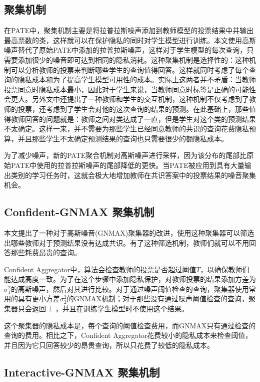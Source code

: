 \documentclass[a4paper]{article}
\begin{document}
\subsection{聚集机制}

在PATE中，聚集机制主要是将拉普拉斯噪声添加到教师模型的投票结果中并输出最高票数的类，这样就可以在保护隐私的同时对学生模型进行训练。本文使用高斯噪声替代了原始PATE中添加的拉普拉斯噪声，这样对于学生模型的每次查询，只需要添加很少的噪音即可达到相同的隐私消耗。这种聚集机制是选择性的：这种机制可以分析教师的投票来判断哪些学生的查询值得回答。这样就同时考虑了每个查询的隐私成本和为了提高学生模型可用性的成本。实际上这两者并不矛盾：当教师投票同意时隐私成本最小，因此对于学生来说，当教师同意时标签是正确的可能性会更大。另外文中还提出了一种教师和学生的交互机制，这种机制不仅考虑到了教师的投票，还考虑到了学生会对他的这次查询的结果的预测。在此基础上，那些值得教师回答的问题就是：教师之间对类达成了一直，但是学生对这个类的预测结果不太确定。这样一来，并不需要为那些学生已经同意教师的共识的查询花费隐私预算，并且那些学生不太确定预测结果的查询也只需要很少的额隐私成本。

为了减少噪声，新的PATE聚合机制对高斯噪声进行采样，因为该分布的尾部比原始PATE中使用的拉普拉斯噪声的尾部降低的更快。当PATE被应用到具有大量输出类别的学习任务时，这就会极大地增加教师在共识答案中的投票结果的噪音聚集机会。

\subsection{Confident-GNMAX 聚集机制}
本文提出了一种对于高斯噪音(GNMAX)聚集器的改进，使用这种聚集器可以筛选出哪些教师对于预测结果没有达成共识。有了这种筛选机制，教师们就可以不用回答那些耗费昂贵的查询。

Confident Aggregator中，算法会检查教师的投票是否超过阈值$T$，以确保教师们能达成高度一致。为了在这个步骤中添加隐私保护，对教师投票的结果添加方差为$\sigma_1^2$的高斯噪声，然后对其进行比较。对于通过噪声阈值检查的查询，聚集器使用常用的具有更小方差$\sigma_2^2$的GNMAX机制；对于那些没有通过噪声阈值检查的查询，聚集器只会返回$\perp$，并且在训练学生模型时不使用这个结果。

这个聚集器的隐私成本是，每个查询的阈值检查费用，而GNMAX只有通过检查的查询的费用。相比之下，Confident Aggregator花费较小的隐私成本来检查阈值，并且因为它只回答较少的昂贵查询，所以只花费了较低的隐私成本。

\subsection{Interactive-GNMAX 聚集机制}
\end{document}
